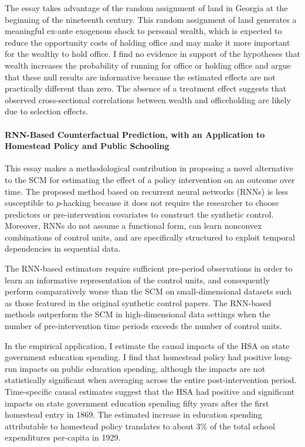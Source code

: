 The essay takes advantage of the random assignment of land in Georgia at the beginning of the nineteenth century. This random assignment of land generates a meaningful ex-ante exogenous shock to personal wealth, which is expected to reduce the opportunity costs of holding office and may make it more important for the wealthy to hold office. I find no evidence in support of the hypotheses that wealth increases the probability of running for office or holding office and argue that these null results are informative because the estimated effects are not practically different than zero. The absence of a treatment effect suggests that observed cross-sectional correlations between wealth and officeholding are likely due to selection effects. 

\paragraph{RNN-Based Counterfactual Prediction, with an Application to Homestead Policy and Public Schooling}

This essay makes a methodological contribution in proposing a novel alternative to the SCM for estimating the effect of a policy intervention on an outcome over time. The proposed method based on recurrent neural networks (RNNs) is less susceptible to $p$-hacking because it does not require the researcher to choose predictors or pre-intervention covariates to construct the synthetic control. Moreover, RNNs do not assume a functional form, can learn nonconvex combinations of control units, and are specifically structured to exploit temporal dependencies in sequential data.

The RNN-based estimators require sufficient pre-period observations in order to learn an informative representation of the control units, and consequently perform comparatively worse than the SCM on small-dimensional datasets such as those featured in the original synthetic control papers. The RNN-based methods outperform the SCM in high-dimensional data settings when the number of pre-intervention time periods exceeds the number of control units.

In the empirical application, I estimate the causal impacts of the HSA on state government education spending. I find that homestead policy had positive long-run impacts on public education spending, although the impacts are not statistically significant when averaging across the entire post-intervention period. Time-specific causal estimates suggest that the HSA had positive and significant impacts on state government education spending fifty years after the first homestead entry in 1869. The estimated increase in education spending attributable to homestead policy translates to about 3\% of the total school expenditures per-capita in 1929.